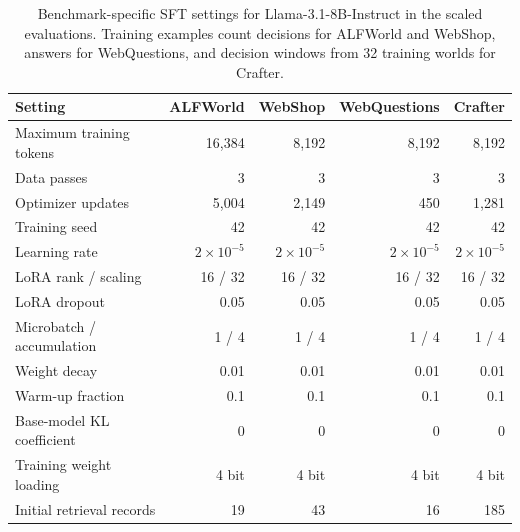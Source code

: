\begin{table}[t]
\centering\footnotesize\setlength{\tabcolsep}{4pt}
\caption{Benchmark-specific SFT settings for Llama-3.1-8B-Instruct in the scaled evaluations. Training examples count decisions for ALFWorld and WebShop, answers for WebQuestions, and decision windows from 32 training worlds for Crafter.}
\label{tab:llama-hyperparameters}
\begin{tabular}{@{}lrrrr@{}}
\toprule
Setting & ALFWorld & WebShop & WebQuestions & Crafter\\
\midrule
Maximum training tokens & 16,384 & 8,192 & 8,192 & 8,192\\
Data passes & 3 & 3 & 3 & 3\\
Optimizer updates & 5,004 & 2,149 & 450 & 1,281\\
Training seed & 42 & 42 & 42 & 42\\
Learning rate & $2\times10^{-5}$ & $2\times10^{-5}$ & $2\times10^{-5}$ & $2\times10^{-5}$\\
LoRA rank / scaling & 16 / 32 & 16 / 32 & 16 / 32 & 16 / 32\\
LoRA dropout & 0.05 & 0.05 & 0.05 & 0.05\\
Microbatch / accumulation & 1 / 4 & 1 / 4 & 1 / 4 & 1 / 4\\
Weight decay & 0.01 & 0.01 & 0.01 & 0.01\\
Warm-up fraction & 0.1 & 0.1 & 0.1 & 0.1\\
Base-model KL coefficient & 0 & 0 & 0 & 0\\
Training weight loading & 4 bit & 4 bit & 4 bit & 4 bit\\
Initial retrieval records & 19 & 43 & 16 & 185\\
\bottomrule
\end{tabular}
\end{table}

